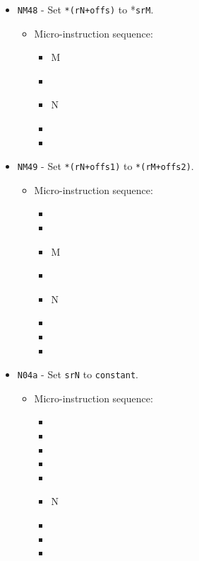 \documentclass{article}
\begin{document}
\begin{itemize}
    \item \Verb|NM48| - Set \Verb|*(rN+offs)| to *\Verb|srM|.
    \begin{itemize}
        \item Micro-instruction sequence:
        \begin{itemize}
            \item \specialptodata M
            \item \holddata
            \item \regtoaddr N
            \item \writeRAM
            \item \done
        \end{itemize}
    \end{itemize}

    \item \Verb|NM49| - Set \Verb|*(rN+offs1)| to \Verb|*(rM+offs2)|.
    \begin{itemize}
        \item Micro-instruction sequence:
        \begin{itemize}
            \item \pkptroutinc
            \item \datatooffs
            \item \regptodatao M
            \item \holddata
            \item \regtoaddr N
            \item \writeRAM
            \item \incrementpk
            \item \done
        \end{itemize}
    \end{itemize}

    \item \Verb|N04a| - Set \Verb|srN| to \Verb|constant|.
    \begin{itemize}
        \item Micro-instruction sequence:
        \begin{itemize}
            \item \pkptroutinc
            \item \datatooffs
            \item \incrementpk
            \item \pkptroutinc
            \item \holddata
            \item \specialtoaddr N
            \item \writeRAMo
            \item \incrementpk
            \item \done
        \end{itemize}
    \end{itemize}
    

\end{itemize}
\end{document}
